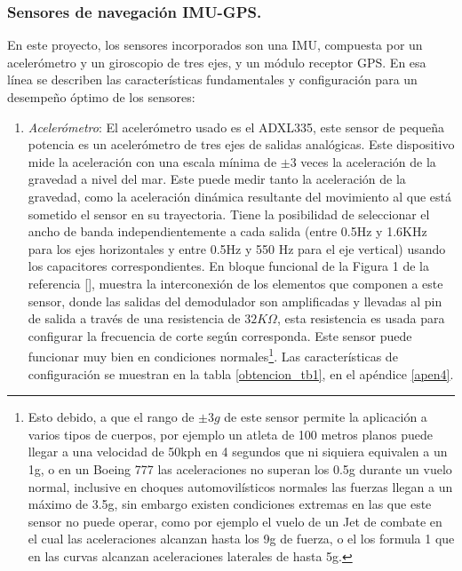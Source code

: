\documentclass[10pt]{report}
\numberwithin{equation}{chapter}
\numberwithin{algorithm}{chapter}
\begin{document}
\subsubsection{Sensores de navegación IMU-GPS.}
En este proyecto, los sensores incorporados son una IMU, compuesta por un acelerómetro y un giroscopio de tres ejes, y un módulo receptor GPS. En esa línea se describen las características fundamentales y configuración para un desempeño óptimo de los sensores:\par
\begin{enumerate}
\item \emph{Acelerómetro}: El acelerómetro usado es el ADXL335, este sensor de pequeña potencia es un acelerómetro de tres ejes de salidas analógicas. Este dispositivo mide la aceleración con una escala mínima de $\pm3$ veces la aceleración de la gravedad a nivel del mar. Este puede medir tanto la aceleración de la gravedad, como la aceleración dinámica resultante del movimiento al que está sometido el sensor en su trayectoria. Tiene la posibilidad de seleccionar el ancho de banda independientemente a cada salida (entre 0.5Hz y 1.6KHz para los ejes horizontales y entre 0.5Hz y 550 Hz para el eje vertical) usando los capacitores correspondientes. En bloque funcional de la Figura 1 de la referencia [\cite{AnalogDevices2009}], muestra la interconexión de los elementos que componen a este sensor, donde las salidas del demodulador son amplificadas y llevadas al pin de salida a través de una resistencia de $32K\Omega$, esta resistencia es usada para configurar la frecuencia de corte según corresponda. Este sensor puede funcionar muy bien en condiciones normales\footnote{Esto debido, a que el rango de $\pm3g$ de este sensor permite la aplicación a varios tipos de cuerpos, por ejemplo un atleta de 100 metros planos puede llegar a una velocidad de 50kph en 4 segundos que ni siquiera equivalen a un 1g, o en un Boeing 777 las aceleraciones no superan los 0.5g durante un vuelo normal, inclusive en choques automovilísticos normales las fuerzas llegan a un máximo de 3.5g, sin embargo existen condiciones extremas en las que este sensor no puede operar, como por ejemplo el vuelo de un Jet de combate en el cual las aceleraciones alcanzan hasta los 9g de fuerza, o el los formula 1 que en las curvas alcanzan aceleraciones laterales de hasta 5g.}. Las características de configuración se muestran en la tabla \ref{obtencion_tb1}, en el apéndice \ref{apen4}.\par

\end{enumerate}
\end{document}
